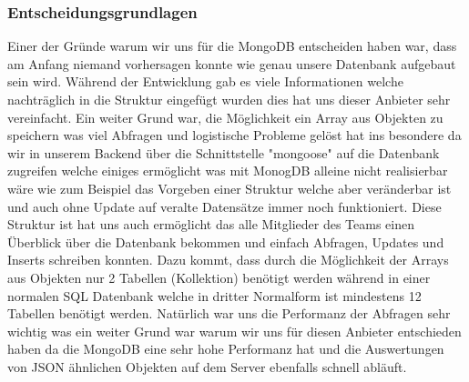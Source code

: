 \documentclass[12pt, letterpaper, twoside]{article}
\begin{document}
		\subsubsection{Entscheidungsgrundlagen}
			Einer der Gründe warum wir uns für die MongoDB entscheiden haben war, dass am Anfang niemand vorhersagen konnte wie genau unsere Datenbank aufgebaut sein wird. Während der Entwicklung gab es viele Informationen welche nachträglich in die Struktur eingefügt wurden dies hat uns dieser Anbieter sehr vereinfacht. Ein weiter Grund war, die Möglichkeit ein Array aus Objekten zu speichern was viel Abfragen und logistische Probleme gelöst hat ins besondere da wir in unserem Backend über die Schnittstelle "mongoose" auf die Datenbank zugreifen welche einiges ermöglicht was mit MonogDB alleine nicht realisierbar wäre wie zum Beispiel das Vorgeben einer Struktur welche aber veränderbar ist und auch ohne Update auf veralte Datensätze immer noch funktioniert. Diese Struktur ist hat uns auch ermöglicht das alle Mitglieder des Teams einen Überblick über die Datenbank bekommen und einfach Abfragen, Updates und Inserts schreiben konnten. Dazu kommt, dass durch die Möglichkeit der Arrays aus Objekten nur 2 Tabellen (Kollektion) benötigt werden während in einer normalen SQL Datenbank welche in dritter Normalform ist mindestens 12 Tabellen benötigt werden. Natürlich war uns die Performanz der Abfragen sehr wichtig was ein weiter Grund war warum wir uns für diesen Anbieter entschieden haben da die MongoDB eine sehr hohe Performanz hat und die Auswertungen von JSON ähnlichen Objekten auf dem Server ebenfalls schnell abläuft.
		
	
	
\end{document}
